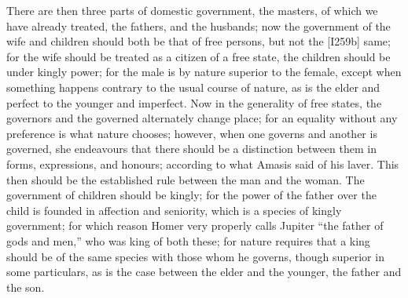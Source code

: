 
There are then three parts of domestic government, the masters, of which
we have already treated, the fathers, and the husbands; now the government
of the wife and children should both be that of free persons, but not the
[I259b] same; for the wife should be treated as a citizen of a free state,
the children should be under kingly power; for the male is by nature
superior to the female, except when something happens contrary to the
usual course of nature, as is the elder and perfect to the younger and
imperfect. Now in the generality of free states, the governors and the
governed alternately change place; for an equality without any preference
is what nature chooses; however, when one governs and another is governed,
she endeavours that there should be a distinction between them in forms,
expressions, and honours; according to what Amasis said of his laver. This
then should be the established rule between the man and the woman. The
government of children should be kingly; for the power of the father over
the child is founded in affection and seniority, which is a species of
kingly government; for which reason Homer very properly calls Jupiter ``the
father of gods and men,'' who was king of both these; for nature requires
that a king should be of the same species with those whom he governs,
though superior in some particulars, as is the case between the elder and
the younger, the father and the son.


